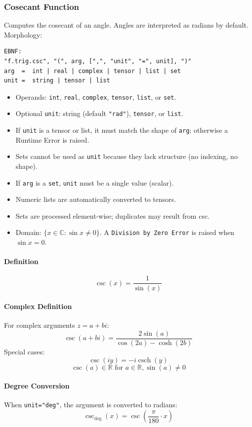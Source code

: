 \subsubsection{Cosecant Function}
Computes the cosecant of an angle. Angles are interpreted as radians by default.\\
Morphology:
\begin{verbatim}
EBNF:
"f.trig.csc", "(", arg, [",", "unit", "=", unit], ")"
arg  =  int | real | complex | tensor | list | set
unit =  string | tensor | list
\end{verbatim}
\begin{itemize}
\item Operands: \texttt{int}, \texttt{real}, \texttt{complex}, \texttt{tensor}, \texttt{list}, or \texttt{set}.
\item Optional \texttt{unit}: string (default \texttt{"rad"}), \texttt{tensor}, or \texttt{list}.
\item If \texttt{unit} is a tensor or list, it must match the shape of \texttt{arg}; otherwise a Runtime Error is raised.
\item Sets cannot be used as \texttt{unit} because they lack structure (no indexing, no shape).
\item If \texttt{arg} is a \texttt{set}, \texttt{unit} must be a single value (scalar).
\item Numeric lists are automatically converted to tensors.
\item Sets are processed element-wise; duplicates may result from csc.
\item Domain: $\{x \in \mathbb{C} : \sin x \neq 0\}$. A \texttt{Division by Zero Error} is raised when $\sin x = 0$.
\end{itemize}

\paragraph{Definition}
\[
\csc(x) = \frac{1}{\sin(x)}
\]

\paragraph{Complex Definition}
For complex arguments $z = a + bi$:
\[
\csc(a + bi) = \frac{2\sin(a)}{\cos(2a) - \cosh(2b)}
\]
Special cases:
\[
\csc(iy) = -i\operatorname{csch}(y)
\]
\[
\csc(a) \in \mathbb{R} \text{ for } a \in \mathbb{R}, \sin(a) \neq 0
\]

\paragraph{Degree Conversion}
When \texttt{unit="deg"}, the argument is converted to radians:
\[
\csc_{\text{deg}}(x) = \csc\left(\frac{\pi}{180} \cdot x\right)
\]

